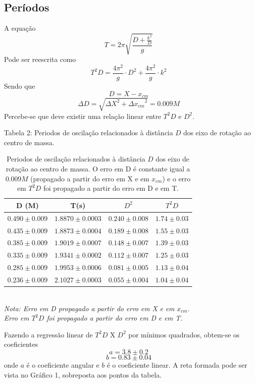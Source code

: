 \documentclass[12pt,a4paper]{article}
\begin{document}
\subsection{Períodos}
A equação $$ T = 2\pi\sqrt{\frac{D + \frac{k^2}{D}}{g}} $$ 
Pode ser reescrita como 
\begin{equation} \label{eq:funcao}
 T^2D = \frac{4\pi^2}{g} \cdot D^2 + \frac{4\pi^2}{g} \cdot k^2 
\end{equation}
Sendo que $$D = X - x_{cm} $$ 
$$ \Delta D = \sqrt{{\Delta X}^2 + {\Delta x_{cm}}^2}  = 0.009M$$
Percebe-se que deve existir uma relação linear entre $T^2D$ e $D^2$.
\newpage


  
\begin{table}[!htbp]
\caption{Periodos de oscilação relacionados à distância $D$ dos eixo de rotação ao centro de massa. O erro em D é constante igual a $0.009 M$ (propagado a partir do erro em X e em $x_{cm}$) e o erro em $T^2D$ foi propagado a partir do erro em D e em T.}
\def\arraystretch{1.5}

{Tabela 2: Periodos de oscilação relacionados à distância $D$ dos eixo de rotação ao centro de massa.}\\[10pt]

\begin{tabular}{|c|c|c|c|}
\hline
D (M)& T(s) & $D^2$ & $T^2D$ \\
\hline
$0.490\pm0.009$ & $1.8870 \pm 0.0003$ & $0.240\pm0.008$ & $1.74 \pm 0.03$\\
\hline
$0.435\pm0.009$ & $1.8873 \pm 0.0004$ & $0.189\pm0.008$ & $1.55 \pm 0.03$\\
\hline
$0.385\pm0.009$ & $1.9019 \pm 0.0007$ & $0.148\pm0.007$ & $1.39 \pm 0.03$\\
\hline
$0.335\pm0.009$ & $1.9341 \pm 0.0002$ & $0.112\pm0.007$ & $1.25 \pm 0.03$\\
\hline
$0.285\pm0.009$ & $1.9953 \pm 0.0006$ & $0.081\pm0.005$ & $1.13 \pm 0.04$\\
\hline
$0.236\pm0.009$ & $2.1027 \pm 0.0003$ & $0.055\pm0.004$ & $1.04 \pm 0.04$\\
\hline
\end{tabular}
\\
\emph {Nota: Erro em D propagado a partir do erro em X e em $x_{cm}$.\\
			Erro em $T^2D$ foi propagado a partir do erro em D e em T.\\}
\end{table}

Fazendo a regressão linear de $T^2D$ X $D^2$ por mínimos quadrados, obtem-se os coeficientes $$ a = 3.8 \pm 0.2 $$  $$ b = 0.83 \pm 0.04 $$ onde $a$ é o coeficiente angular e $b$ é o coeficiente linear. A reta formada pode ser vista no Gráfico 1, sobreposta aos pontos da tabela.
\end{document}
